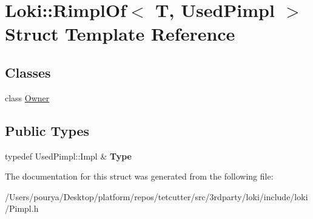 \hypertarget{structLoki_1_1RimplOf}{}\section{Loki\+:\+:Rimpl\+Of$<$ T, Used\+Pimpl $>$ Struct Template Reference}
\label{structLoki_1_1RimplOf}
\subsection*{Classes}
\begin{DoxyCompactItemize}
\item 
class \hyperlink{classLoki_1_1RimplOf_1_1Owner}{Owner}
\end{DoxyCompactItemize}
\subsection*{Public Types}
\begin{DoxyCompactItemize}
\item 
\hypertarget{structLoki_1_1RimplOf_ab80a3e16dffe7f1c84d074042947c754}{}typedef Used\+Pimpl\+::\+Impl \& {\bfseries Type}\label{structLoki_1_1RimplOf_ab80a3e16dffe7f1c84d074042947c754}

\end{DoxyCompactItemize}


The documentation for this struct was generated from the following file\+:\begin{DoxyCompactItemize}
\item 
/\+Users/pourya/\+Desktop/platform/repos/tetcutter/src/3rdparty/loki/include/loki/Pimpl.\+h\end{DoxyCompactItemize}
